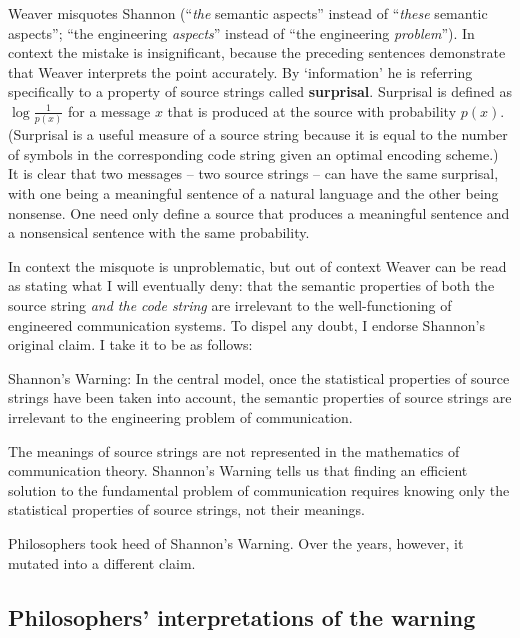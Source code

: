 \documentclass[12pt]{article}
\begin{document}
\noindent Weaver misquotes Shannon (``\emph{the} semantic aspects'' instead of ``\emph{these} semantic aspects''; ``the engineering \textit{aspects}'' instead of ``the engineering \textit{problem}'').
In context the mistake is insignificant, because the preceding sentences demonstrate that Weaver interprets the point accurately.
By `information' he is referring specifically to a property of source strings called \textbf{surprisal}.
Surprisal is defined as $\log{\frac{1}{p(x)}}$ for a message $x$ that is produced at the source with probability $p(x)$.
(Surprisal is a useful measure of a source string because it is equal to the number of symbols in the corresponding code string given an optimal encoding scheme.)
It is clear that two messages -- two source strings -- can have the same surprisal, with one being a meaningful sentence of a natural language and the other being nonsense.
One need only define a source that produces a meaningful sentence and a nonsensical sentence with the same probability.

In context the misquote is unproblematic, but out of context Weaver can be read as stating what I will eventually deny: that the semantic properties of both the source string \textit{and the code string} are irrelevant to the well-functioning of engineered communication systems.
To dispel any doubt, I endorse Shannon's original claim.
I take it to be as follows:

\begin{myquote}
{\sc Shannon's Warning}: In the central model, once the statistical properties of source strings have been taken into account, the semantic properties of source strings are irrelevant to the engineering problem of communication.
\end{myquote}

\noindent The meanings of source strings are not represented in the mathematics of communication theory.
{\sc Shannon's Warning} tells us that finding an efficient solution to the fundamental problem of communication requires knowing only the statistical properties of source strings, not their meanings.

Philosophers took heed of {\sc Shannon's Warning}.
Over the years, however, it mutated into a different claim.


\subsection{Philosophers' interpretations of the warning}\label{subsec:warningPhil}
\end{document}
